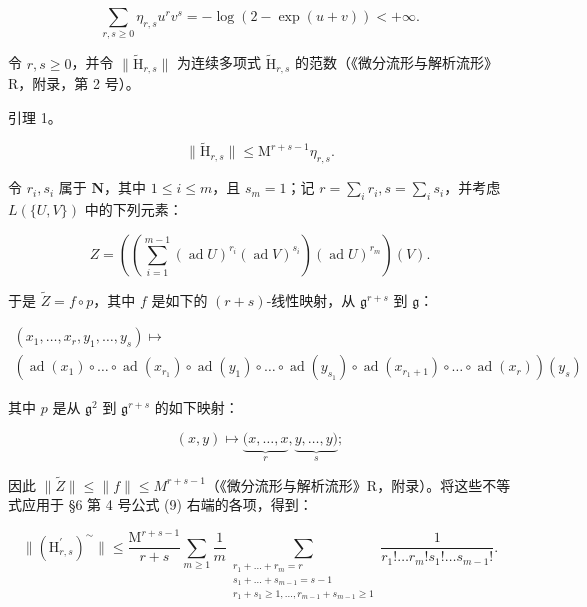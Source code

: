 \[
\sum_ {r, s \geqslant 0} \eta_ {r, s} u ^ {r} v ^ {s} = - \log (2 - \exp (u + v)) <   + \infty .\tag{9}
\]

令 \(r, s \geqslant 0\)，并令 \(\| \tilde{\mathrm{H}}_{r,s} \|\) 为连续多项式 \(\tilde{\mathrm{H}}_{r,s}\) 的范数（《微分流形与解析流形》R，附录，第 2 号）。

引理 1。

\[
\| \widetilde {\mathrm{H}} _ {r, s} \| \leqslant \mathrm{M} ^ {r + s - 1} \eta_ {r, s}.
\]

令 \(r_i, s_i\) 属于 \(\mathbf{N}\)，其中 \(1 \leqslant i \leqslant m\)，且 \(s_m = 1\)；记 \(r = \sum_{i} r_i, s = \sum_{i} s_i\)，并考虑 \(L(\{U, V\})\) 中的下列元素：

\[
Z = \left(\left(\sum_ {i = 1} ^ {m - 1} (\operatorname{ad} U) ^ {r _ {i}} (\operatorname{ad} V) ^ {s _ {i}}\right) (\operatorname{ad} U) ^ {r _ {m}}\right) (V).
\]

于是 \(\tilde{Z} = f \circ p\)，其中 \(f\) 是如下的 \((r + s)\)-线性映射，从 \(\mathfrak{g}^{r + s}\) 到 \(\mathfrak{g}\)：

\[
\begin{array}{l} \left(x _ {1}, \dots , x _ {r}, y _ {1}, \dots , y _ {s}\right) \mapsto \\ \left(\operatorname{ad} \left(x _ {1}\right) \circ \dots \circ \operatorname{ad} \left(x _ {r _ {1}}\right) \circ \operatorname{ad} \left(y _ {1}\right) \circ \dots \circ \operatorname{ad} \left(y _ {s _ {1}}\right) \circ \operatorname{ad} \left(x _ {r _ {1} + 1}\right) \circ \dots \circ \operatorname{ad} \left(x _ {r}\right)\right) \left(y _ {s}\right) \end{array}
\]

其中 \(p\) 是从 \(\mathfrak{g}^2\) 到 \(\mathfrak{g}^{r+s}\) 的如下映射：

\[
(x, y) \mapsto \underbrace {(x , \dots , x} _ {r}, \underbrace {y , \dots , y)} _ {s};
\]

因此 \(\| \tilde{Z}\| \leqslant \| f\| \leqslant M^{r + s - 1}\)（《微分流形与解析流形》R，附录）。将这些不等式应用于 §6 第 4 号公式 (9) 右端的各项，得到：

\[
\| (\mathrm{H} _ {r, s} ^ {\prime}) ^ {\sim} \| \leqslant \frac {\mathrm{M} ^ {r + s - 1}}{r + s} \sum_ {m \geqslant 1} \frac {1}{m} \sum_ {\substack {r _ {1} + \dots + r _ {m} = r \\ s _ {1} + \dots + s _ {m - 1} = s - 1 \\ r _ {1} + s _ {1} \geqslant 1, \dots , r _ {m - 1} + s _ {m - 1} \geqslant 1}} \frac {1}{r _ {1} ! \dots r _ {m} ! s _ {1} ! \dots s _ {m - 1} !}.\tag{10}
\]

